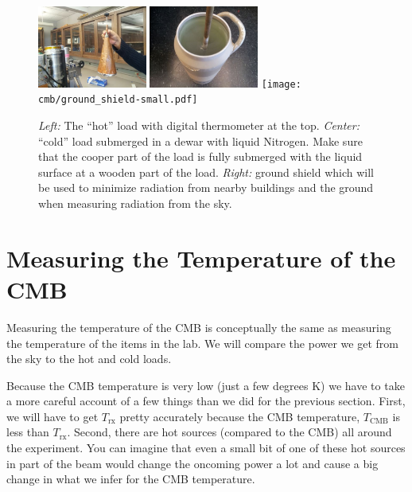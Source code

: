 \begin{figure}[ht!]
	\begin{center}
		\includegraphics[trim=0pt 0pt 0pt 0pt,width=0.32\textwidth]{cmb/hot_load-small.pdf}
		\includegraphics[trim=0pt 0pt 0pt 0pt,width=0.32\textwidth]{cmb/cold_load-small.pdf}
		\texttt{[image: cmb/ground\_shield-small.pdf]}
		\caption{\textit{Left:} The ``hot'' load with digital thermometer at the top. \textit{Center:} ``cold'' load submerged in a dewar with liquid Nitrogen. Make sure that the cooper part of the load is fully submerged with the liquid surface at a wooden part of the load. \textit{Right:} ground shield which will be used to minimize radiation from nearby buildings  and the ground when measuring radiation from the sky. } 
		\label{fig:details}
	\end{center}
\end{figure}

\section{Measuring the Temperature of the CMB}

Measuring the temperature of the CMB is conceptually the same as  measuring the temperature of the items in the lab. We will compare the power we get from the sky to the hot and cold loads.

Because the CMB temperature is very low (just a few degrees K) we have to take a more careful account of a few things than we did for the previous section. First, we will have to get $T_\textrm{rx}$ pretty accurately because the CMB temperature, $T_\textrm{CMB}$ is less than $T_\textrm{rx}$. Second, there are hot sources (compared to the CMB) all around the experiment. You can imagine that even a small bit of one of these hot sources in part of the beam would change the oncoming power a lot and cause a big change in what we infer for the CMB temperature. 

